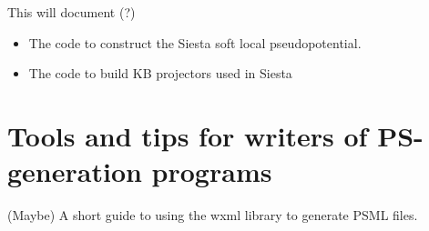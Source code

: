 \documentclass[prb,showpacs,superscriptaddress]{revtex4-1}
\begin{document}
This will document (?)
\begin{itemize}
\item The code to construct the Siesta soft local pseudopotential.
\item The code to build KB projectors used in Siesta
\end{itemize}

\section{Tools and tips for writers of PS-generation programs}
(Maybe)
A short guide to using the wxml library to generate PSML files.


%
\end{document}
